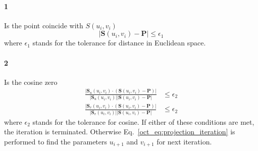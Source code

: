 \paragraph{1}
Is the point coincide with $S(u_i, v_i)$
\begin{equation*}
    |\mathbf{S} (u_i, v_i) - \mathbf{P}| \leq \epsilon_1
\end{equation*}
%
where $\epsilon_1$ stands for the tolerance for distance in Euclidean space.
\paragraph{2}
Is the cosine zero
\begin{align*}
    \frac{
        |\mathbf{S}_u (u_i, v_i) \cdot
        \left(
            \mathbf{S}(u_i, v_i) - \mathbf{P}
        \right)|
    }{
        |\mathbf{S}_u (u_i, v_i)|
        |\mathbf{S}(u_i, v_i) - \mathbf{P}|
    } & \leq \epsilon_2 \\
    \frac{
        |\mathbf{S}_v (u_i, v_i) \cdot
        \left(
            \mathbf{S}(u_i, v_i) - \mathbf{P}
        \right)|
    }{
        |\mathbf{S}_v (u_i, v_i)|
        |\mathbf{S}(u_i, v_i) - \mathbf{P}|
    } & \leq \epsilon_2
\end{align*}
%
where $\epsilon_2$ stands for the tolerance for cosine.
If either of these conditions are met, the iteration is terminated.
Otherwise Eq.~\ref{oct_eq:projection_iteration} is performed to find the parameters $u_{i+1}$ and $v_{i+1}$ for next iteration.
